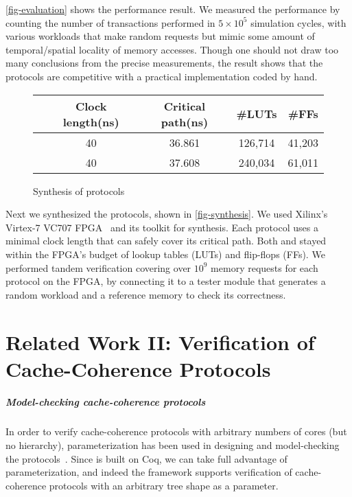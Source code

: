 \autoref{fig-evaluation} shows the performance result.
We measured the performance by counting the number of transactions performed in $5 \times 10^5$ simulation cycles, with various workloads that make random requests but mimic some amount of temporal/spatial locality of memory accesses.
Though one should not draw too many conclusions from the precise measurements, the result shows that the \hemiola{} protocols are competitive with a practical implementation coded by hand.

\begin{figure}[t]
  \centering
  \begin{tabular}{ccccc}
    \hline
    & Clock length\;(ns) & Critical path\;(ns) & \#LUTs & \#FFs\\
    \hline
    \bhemt{} & 40 & 36.861 & 126,714 & 41,203\\
    \bhemh{} & 40 & 37.608 & 240,034 & 61,011\\
    \hline
  \end{tabular}
  \caption{Synthesis of \hemiola{} protocols}
  \label{fig-synthesis}
\end{figure}

Next we synthesized the \hemiola{} protocols, shown in \autoref{fig-synthesis}.
We used Xilinx's Virtex-7 VC707 FPGA~\cite{vc707} and its toolkit for synthesis.
Each protocol uses a minimal clock length that can safely cover its critical path.
Both \bhemh{} and \bhemt{} stayed within the FPGA's budget of lookup tables (LUTs) and flip-flops (FFs).
We performed tandem verification covering over $10^9$ memory requests for each protocol on the FPGA, by connecting it to a tester module that generates a random workload and a reference memory to check its correctness.

\chapter{Related Work II: Verification of Cache-Coherence Protocols}
\label{sec-related-work-i}


\paragraph{Model-checking cache-coherence protocols}

In order to verify cache-coherence protocols with arbitrary numbers of cores (but no hierarchy), parameterization has been used in designing and model-checking the protocols~\cite{Zhang:2010,Zhang:2014,Banks:2017}.
Since \hemiola{} is built on Coq, we can take full advantage of parameterization, and indeed the framework supports verification of cache-coherence protocols with an arbitrary tree shape as a parameter.

